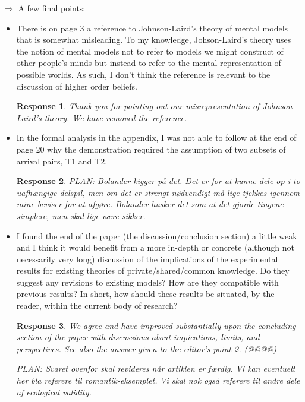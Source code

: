 \documentclass[a4paper]{article}
\newtheorem{response}{Response}
\begin{document}
$\Rightarrow$ A few final points:
\begin{itemize}
\item  There is on page 3 a reference to Johnson-Laird's theory of mental models that is somewhat misleading. To my knowledge, Johson-Laird's theory uses the notion of mental models not to refer to models we might construct of other people's minds but instead to refer to the mental representation of possible worlds. As such, I don't think the reference is relevant to the discussion of higher order beliefs.

\begin{response} Thank you for pointing out our misrepresentation of Johnson-Laird's theory. We have removed the reference.\end{response}
 
\item In the formal analysis in the appendix, I was not able to follow at the end of page 20 why the demonstration required the assumption of two subsets of arrival pairs, T1 and T2.

\begin{response}
PLAN: Bolander kigger på det. Det er for at kunne dele op i to uafhængige delspil, men om det er strengt nødvendigt må lige tjekkes igennem mine beviser for at afgøre. Bolander husker det som at det gjorde tingene simplere, men skal lige være sikker. 
\end{response} 



\item I found the end of the paper (the discussion/conclusion section) a little weak and I think it would benefit from a more in-depth or concrete (although not necessarily very long) discussion of the implications of the experimental results for existing theories of private/shared/common knowledge. Do they suggest any revisions to existing models? How are they compatible with previous results? In short, how should these results be situated, by the reader, within the current body of research?

\begin{response} 
We agree and have improved substantially upon the concluding section of the paper with discussions about impications, limits, and perspectives. See also the answer given to the editor's point 2. (@@@@) 

PLAN: Svaret ovenfor skal revideres når artiklen er færdig. Vi kan eventuelt her bla referere til romantik-eksemplet. Vi skal nok også referere til andre dele af ecological validity.
\end{response}
\end{itemize}
\end{document}
